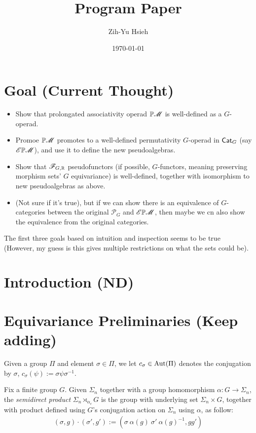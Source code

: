 \documentclass{article}
\title{Program Paper}
\author{Zih-Yu Hsieh}
\date{\today}
\begin{document}
\maketitle
\tableofcontents

\section{Goal (Current Thought)}

\begin{itemize}
    \item[1.] Show that prolongated associativity operad $\mathbb{P}\mathscr{M}$ is well-defined as a $G$-operad.
    \item[2.] Promoe $\mathbb{P}\mathscr{M}$ promotes to a well-defined permutativity $G$-operad in $\mathsf{Cat}_G$ (say $\mathscr{E}\mathbb{P}\mathscr{M}$), and use it to define the new pseudoalgebras. 
    \item[3.] Show that $\mathscr{F}_{G,\mathbb{R}}$ pseudofunctors (if possible, $G$-functors, meaning preserving morphism sets' $G$ equivariance) is well-defined, together with isomorphism to new pseudoalgebras as above.
    \item[4.] (Not sure if it's true), but if we can show there is an equivalence of $G$-categories between the original $\mathscr{P}_G$ and $\mathscr{E}\mathbb{P}\mathscr{M}$, then maybe we cn also show the equivalence from the original categories.
\end{itemize}

The first three goals based on intuition and inspection seems to be true (However, my guess is this gives multiple restrictions on what the sets could be).

\section{Introduction (ND)}

\newpage

\section{Equivariance Preliminaries (Keep adding)}

Given a group $\Pi$ and element $\sigma\in\Pi$, we let $c_\sigma\in\mathrm{Aut}(\Pi)$ denotes the conjugation by $\sigma$, $c_\sigma(\psi):= \sigma\psi\sigma^{-1}$.

\hfil

\begin{defn}
    Fix a finite group $G$. Given $\Sigma_n$ together with a group homomorphism $\alpha:G\rightarrow\Sigma_n$, the \emph{semidirect product} $\Sigma_n\rtimes_{\alpha_c}G$ is the group with underlying set $\Sigma_n\times G$, together with product defined using $G$'s conjugation action on $\Sigma_n$ using $\alpha$, as follow:
    \begin{align*}
        (\sigma,g)\cdot (\sigma',g'):=(\sigma\ \alpha(g)\ \sigma'\ \alpha(g)^{-1},gg')
    \end{align*}
\end{defn}
\end{document}
